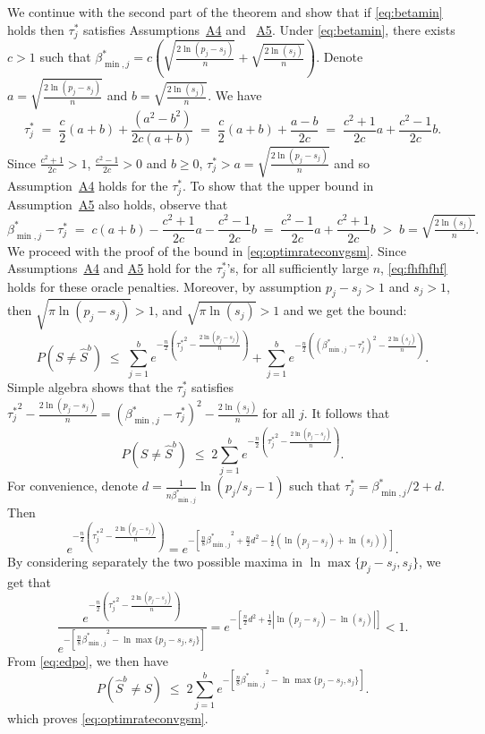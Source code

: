\documentclass[bj,authoryear]{imsart}
\theoremstyle{plain}
\begin{document}
We continue with the second part of the theorem and show that if \eqref{eq:betamin} holds then $\tau^*_j$ satisfies Assumptions~\hyperlink{lab:A4}{A4} and ~\hyperlink{lab:A5}{A5}. Under \eqref{eq:betamin}, there exists $c>1$ such that $\beta^*_{\min,j}=c(\sqrt{\tfrac{2\ln(p_j-s_j)}{n}} + \sqrt{\tfrac{2\ln(s_j)}{n}})$. Denote $a=\sqrt{\tfrac{2\ln(p_j-s_j)}{n}}$ and $b=\sqrt{\tfrac{2\ln(s_j)}{n}}$. We have
$$
\tau_j^*\;=\;\frac{c}{2} (a+b)+\frac{(a^2-b^2)}{2c(a+b)}\;=\;\frac{c}{2} (a+b)+\frac{a-b}{2c}\;=\;\frac{c^2+1}{2c}a+\frac{c^2-1}{2c}b.
$$
Since $\tfrac{c^2+1}{2c}> 1$, $\tfrac{c^2-1}{2c}> 0$ and $b \geq 0$, $\tau^*_j>a=\sqrt{\tfrac{2\ln(p_j-s_j)}{n}}$ and so Assumption~\hyperlink{lab:A4}{A4} holds for the $\tau^*_j$. To show that the upper bound in Assumption~\hyperlink{lab:A5}{A5} also holds, observe that
$$
\beta_{\min,j}^* - \tau^*_j \;=\; c(a+b)- \frac{c^2+1}{2c}a-\frac{c^2-1}{2c}b \;= \; \frac{c^2-1}{2c}a+\frac{c^2+1}{2c}b\;>\;  b=\sqrt{\tfrac{2\ln(s_j)}{n}}.
$$
We proceed with the proof of the bound in \eqref{eq:optimrateconvgsm}. Since Assumptions~\hyperlink{lab:A4}{A4} and \hyperlink{lab:A5}{A5} hold for the $\tau^*_j$'s, for all sufficiently large $n$, \eqref{eq:fhfhfhf} holds for these oracle penalties. Moreover, by assumption $p_j-s_j>1$ and $s_j>1$, then $\sqrt{\pi\ln(p_j-s_j)}>1$, and $\sqrt{\pi\ln(s_j)}>1$ and we get the bound:
$$P(S\neq \hat{S}^b) \; \leq\;\sum_{j=1}^be^{-\tfrac{n}{2}\left({\tau^*_j}^2-\tfrac{2\ln(p_j-s_j)}{n}\right)}+\sum_{j=1}^be^{-\tfrac{n}{2}\left((\beta^*_{\min,j}-\tau^*_j)^2-\tfrac{2\ln(s_j)}{n}\right)}.$$
Simple algebra shows that the $\tau_j^*$ satisfies ${\tau_j^*}^2-\tfrac{2\ln(p_j-s_j)}{n}=(\beta^*_{\min,j}-{\tau_j^*})^2-\tfrac{2\ln(s_j)}{n}$ for all $j$. It follows that
\begin{equation}\label{eq:edpo}
P(S\neq \hat{S}^b) \; \leq\;2\sum_{j=1}^be^{-\tfrac{n}{2}\left({\tau^*_j}^2-\tfrac{2\ln(p_j-s_j)}{n}\right)}.
\end{equation}
For convenience, denote $d = \frac{1}{n \beta_{\min,j}^*} \ln (p_j / s_j-1)$ such that $\tau^*_j= \beta_{\min,j}^*/2 + d$. Then
$$e^{-\frac{n}{2}\left({\tau^*_j}^2-\frac{2\ln(p_j-s_j)}{n}\right)}
=e^{-\left[\frac{n}{8}{\beta_{\min,j}^*}^2+\frac{n}{2}d^2 - \frac{1}{2}\left(\ln (p_j- s_j)+\ln (s_j)\right) \right]}.$$
By considering separately the two possible maxima in $\ln \max\{p_j-s_j,s_j\}$, we get that
$$\frac{e^{-\frac{n}{2}\left({\tau^*_j}^2-\frac{2\ln(p_j-s_j)}{n}\right)}}{e^{-[\frac{n}{8}{\beta_{\min,j}^*}^2-\ln \max\{p_j-s_j,s_j\}]}}= 
e^{-\left[\frac{n}{2}d^2 + \frac{1}{2}\left|\ln (p_j- s_j)-\ln (s_j)\right|\right]} <1.$$
From \eqref{eq:edpo}, we then have
$$P(\hat{S}^{b} \neq S) \; \leq \; 2 \sum_{j=1}^be^{-[\frac{n}{8}{\beta^*_{\min,j}}^2-\ln \max\{p_j-s_j,s_j\}]}.$$
which proves \eqref{eq:optimrateconvgsm}.
\end{document}
